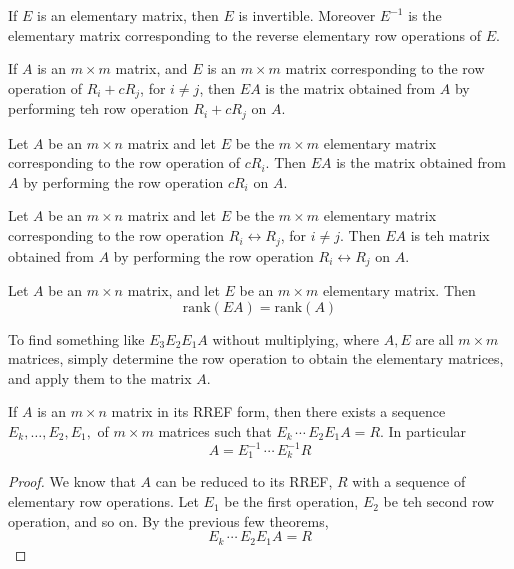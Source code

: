 \documentclass[english, 12pt]{article}
\begin{document}
\begin{thrm}
If $E$ is an elementary matrix, then $E$ is invertible. Moreover $E^{-1}$ is the elementary matrix corresponding to the reverse elementary row operations of $E$.
\end{thrm}

\begin{thrm}
If $A$ is an $m \times m$ matrix, and $E$ is an $m \times m$ matrix corresponding to the row operation of $R_i + cR_j$, for $i \neq j$, then $EA$ is the matrix obtained from $A$ by performing teh row operation $R_i + cR_j$ on $A$.
\end{thrm}

\begin{thrm}
Let $A$ be an $m \times n$ matrix and let $E$ be the $m \times m$ elementary matrix corresponding to the row operation of $cR_i$. Then $EA$ is the matrix obtained from $A$ by performing the row operation $cR_i$ on $A$.
\end{thrm}

\begin{thrm}
Let $A$ be an $m \times n$ matrix and let $E$ be the $m \times m$ elementary matrix corresponding to the row operation $R_i \leftrightarrow R_j $, for $ i \neq j$. Then $EA$ is teh matrix obtained from $A$ by performing the row operation $R_i \leftrightarrow R_j$ on $A$.
\end{thrm}

\begin{thrm}
Let $A$ be an $m \times n$ matrix, and let $E$ be an $m \times m$ elementary matrix. Then
\[\text{rank}(EA) = \text{rank}(A)\]
\end{thrm}

\begin{note}
To find something like $E_3E_2E_1A$ without multiplying, where $A,E$ are all $m \times m$ matrices, simply determine the row operation to obtain the elementary matrices, and apply them to the matrix $A$.
\end{note}

\begin{thrm}
If $A$ is an $m \times n$ matrix in its RREF form, then there exists a sequence $E_k,\dots,E_2,E_1,$ of $m \times m$ matrices such that
$E_k\,\cdots\,E_2 E_1 A = R$. In particular
\[A = E_1^{-1}\,\cdots\,E_k^{-1}R\]

\begin{proof}
We know that $A$ can be reduced to its RREF, $R$ with a sequence of elementary row operations. Let $E_1$ be the first operation, $E_2$ be teh second row operation, and so on. By the previous few theorems,
\[E_k\,\cdots\,E_2 E_1 A = R\]
\end{proof}
\end{thrm}
\end{document}

